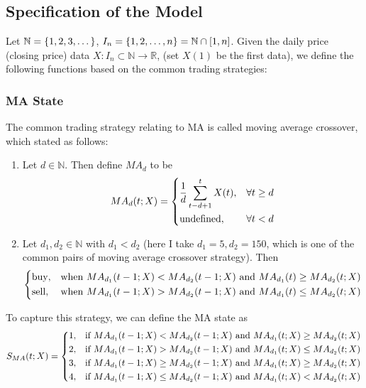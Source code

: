 \documentclass[11pt,a4paper]{article}
\numberwithin{equation}{section}
\newcommand{\R}{\mathbb{R}}
\newcommand{\N}{\mathbb{N}}
\newcommand{\set}[1]{\qty{#1}}
\begin{document}
\subsection{Specification of the Model}

Let $\N = \set{1, 2, 3, \dots}$, $I_n = \set{1, 2, \dots, n} = \N \cap [1, n]$. Given the daily price (closing price) data $X: I_n \subset \N \to \R$, (set $X(1)$ be the first data), we define the following functions based on the common trading strategies:

\subsubsection{MA State}

The common trading strategy relating to MA is called moving average crossover, which stated as follows:
\begin{enumerate}
  \item Let $d \in \N$. Then define $MA_d$ to be
        \begin{align}
          MA_d (t; X) =
          \begin{dcases}
            \frac{1}{d} \sum_{t - d + 1}^t X (t), & \forall t \geq d \\
            \text{undefined},                     & \forall t < d
          \end{dcases}
        \end{align}
  \item Let $d_1, d_2 \in \N$ with $d_1 < d_2$ (here I take $d_1 = 5, d_2 = 150$, which is one of the common pairs of moving average crossover strategy). Then
        \begin{align}
          \begin{dcases}
            \text{buy},  & \text{when $MA_{d_1} (t - 1; X) < MA_{d_2} (t - 1; X)$ and $MA_{d_1} (t) \geq MA_{d_2} (t; X)$} \\
            \text{sell}, & \text{when $MA_{d_1} (t - 1; X) > MA_{d_2} (t - 1; X)$ and $MA_{d_1} (t) \leq MA_{d_2} (t; X)$}
          \end{dcases}
        \end{align}
\end{enumerate}

To capture this strategy, we can define the MA state as
\begin{align}
  S_{MA} (t; X) =
  \begin{dcases}
    1, & \text{if $MA_{d_1} (t - 1; X) < MA_{d_2} (t - 1; X)$ and $MA_{d_1} (t; X) \geq MA_{d_2} (t; X)$}    \\
    2, & \text{if $MA_{d_1} (t - 1; X) > MA_{d_2} (t - 1; X)$ and $MA_{d_1} (t; X) \leq MA_{d_2} (t; X)$}    \\
    3, & \text{if $MA_{d_1} (t - 1; X) \geq MA_{d_2} (t - 1; X)$ and $MA_{d_1} (t; X) \geq MA_{d_2} (t; X)$} \\
    4, & \text{if $MA_{d_1} (t - 1; X) \leq MA_{d_2} (t - 1; X)$ and $MA_{d_1} (t; X) < MA_{d_2} (t; X)$}
  \end{dcases}
\end{align}
\end{document}
